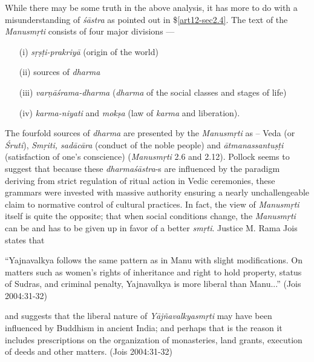 While there may be some truth in the above analysis, it has more to do with a misunderstanding of {\sl śāstra} as pointed out in \$\ref{art12-sec2.4}. The text of the {\sl Manusmṛti} consists of four major divisions ---
\begin{itemize}
\item[(i)] {\sl sṛṣṭi-prakriyā} (origin of the world)

\item[(ii)] sources of {\sl dharma}

\item[(iii)] {\sl varṇāśrama-dharma} ({\sl dharma} of the social classes and stages of life)

\item[(iv)] {\sl karma-niyati} and {\sl mokṣa} (law of {\sl karma} and liberation).
\end{itemize}

The fourfold sources of {\sl dharma} are presented by the {\sl Manusmṛti} as -- Veda (or {\sl Śruti}), {\sl Smṛiti, sadācāra} (conduct of the noble people) and {\sl ātmanassantuṣṭi} (satisfaction of one's conscience) ({\sl Manusmṛti} 2.6 and 2.12). Pollock seems to suggest that because these {\sl dharmaśāstra}-s are influenced by the paradigm deriving from strict regulation of ritual action in Vedic ceremonies, these grammars were invested with massive authority ensuring a nearly unchallengeable claim to normative control of cultural practices. In fact, the view of {\sl Manusmṛti} itself is quite the opposite; that when social conditions change, the {\sl Manusmṛti} can be and has to be given up in favor of a better {\sl smṛti}. Justice M. Rama Jois states that
\begin{myquote}
``Yajnavalkya follows the same pattern as in Manu with slight modifications. On matters such as women's rights of inheritance and right to hold property, status of Sudras, and criminal penalty, Yajnavalkya is more liberal than Manu...'' (Jois 2004:31-32)
\end{myquote}
and suggests that the liberal nature of {\sl Yājñavalkyasmṛti} may have been influenced by Buddhism in ancient India; and perhaps that is the reason it includes prescriptions on the organization of monasteries, land grants, execution of deeds and other matters. (Jois 2004:31-32)

